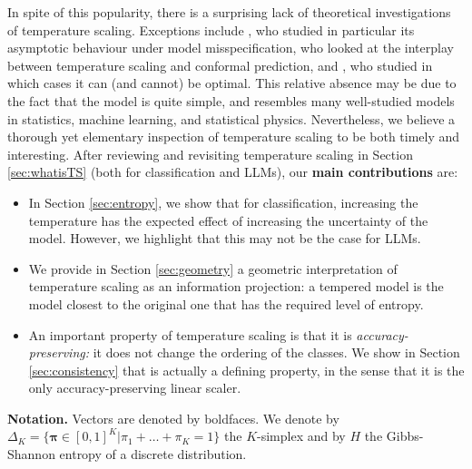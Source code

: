 \documentclass[10pt,dvipsnames]{article}
\newcommand{\bpi}{\boldsymbol{\pi}}%
\theoremstyle{plain}
\theoremstyle{definition}
\theoremstyle{remark}
\begin{document}
In spite of this popularity, there is a surprising lack of theoretical investigations of temperature scaling. Exceptions include \citet{clarte2023double,clarte2023expectation}, who studied in particular its asymptotic behaviour under model misspecification, \citet{dabah2025temperature} who looked at the interplay between temperature scaling and conformal prediction, and \citet{berta2025structured}, who studied in which cases it can (and cannot) be optimal. This relative absence may be due to the fact that the model is quite simple, and resembles many well-studied models in statistics, machine learning, and statistical physics. Nevertheless, we believe a thorough yet elementary inspection of temperature scaling to be both timely and interesting. After reviewing and revisiting temperature scaling in Section \ref{sec:whatisTS} (both for classification and LLMs), our \textbf{main contributions} are:
\begin{itemize}
    \item In Section \ref{sec:entropy}, we show that for classification, increasing the temperature has the expected effect of increasing the uncertainty of the model. However, we highlight that this may not be the case for LLMs.
    \item We provide in Section \ref{sec:geometry} a geometric interpretation of temperature scaling as an information projection: a tempered model is the model closest to the original one that has the required level of entropy.
    \item An important property of temperature scaling is that it is \emph{accuracy-preserving:} it does not change the ordering of the classes. We show in Section \ref{sec:consistency} that is actually a defining property, in the sense that it is the only accuracy-preserving linear scaler.
\end{itemize}

\textbf{Notation.} Vectors are denoted by boldfaces.
We denote by $\Delta_{K}=\{\bpi\in [0,1]^{K} |  \pi_{1} + \ldots + \pi_K=1\}$ the $K$-simplex and by $H$ the Gibbs-Shannon entropy of a discrete distribution.
\end{document}
